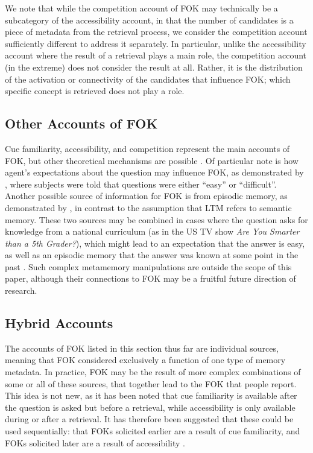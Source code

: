 \documentclass[10pt,letterpaper]{article}
\newcommand{\textcite}[1]{\citeauthor{#1} \citeyear{#1}}
\begin{document}
We note that while the competition account of FOK may technically be a subcategory of the accessibility account, in that the number of candidates is a piece of metadata from the retrieval process, we consider the competition account sufficiently different to address it separately.
In particular, unlike the accessibility account where the result of a retrieval plays a main role, the competition account (in the extreme) does not consider the result at all.
Rather, it is the distribution of the activation or connectivity of the candidates that influence FOK; which specific concept is retrieved does not play a role.

\subsection{Other Accounts of FOK}

Cue familiarity, accessibility, and competition represent the main accounts of FOK, but other theoretical mechanisms are possible \cite{Nelson1984AccuracyOfFeeling}.
Of particular note is how agent's expectations about the question may influence FOK, as demonstrated by \textcite{Widner1996TheEffectsOf}, where subjects were told that questions were either ``easy'' or ``difficult''.
Another possible source of information for FOK is from episodic memory, as demonstrated by \textcite{Schwartz2014ContextualInformationInfluences}, in contrast to the assumption that LTM refers to semantic memory.
These two sources may be combined in cases where the question asks for knowledge from a national curriculum (as in the US TV show \textit{Are You Smarter than a 5th Grader?}), which might lead to an expectation that the answer is easy, as well as an episodic memory that the answer was known at some point in the past \cite{Singer2008FeelingOfKnowing}.
Such complex metamemory manipulations are outside the scope of this paper, although their connections to FOK may be a fruitful future direction of research.

\subsection{Hybrid Accounts}

The accounts of FOK listed in this section thus far are individual sources, meaning that FOK considered exclusively a function of one type of memory metadata.
In practice, FOK may be the result of more complex combinations of some or all of these sources, that together lead to the FOK that people report.
This idea is not new, as it has been noted that cue familiarity is available after the question is asked but before a retrieval, while accessibility is only available during or after a retrieval.
It has therefore been suggested that these could be used sequentially: that FOKs solicited earlier are a result of cue familiarity, and FOKs solicited later are a result of accessibility \cite{Florer2000FeelingsOfKnowing,Koriat2001TheCombinedContributions}.
\end{document}
